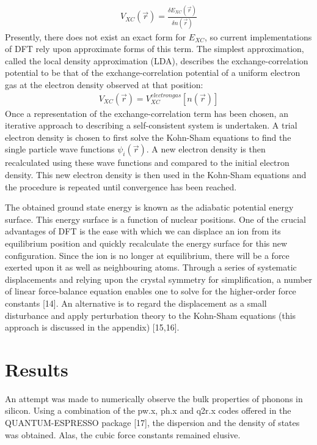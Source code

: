 \documentclass{article}
\numberwithin{equation}{section}
\begin{document}
\begin{align*}
	V_{XC}(\vec{r})=\frac{\delta E_{XC}(\vec{r})}{\delta n(\vec{r})}
\end{align*}
Presently, there does not exist an exact form for $E_{XC}$, so current implementations of DFT rely upon approximate forms of this term. The simplest approximation, called the local density approximation (LDA), describes the exchange-correlation potential to be that of the exchange-correlation potential of a uniform electron gas at the electron density observed at that position:
\begin{align*}
	V_{XC}(\vec{r})=V_{XC}^{electron gas}[n(\vec{r})]
\end{align*}
Once a representation of the exchange-correlation term has been chosen, an iterative approach to describing a self-consistent system is undertaken. A trial electron density is chosen to first solve the Kohn-Sham equations to find the single particle wave functions $\psi_i(\vec{r})$. A new electron density is then recalculated using these wave functions and compared to the initial electron density. This new electron density is then used in the Kohn-Sham equations and the procedure is repeated until convergence has been reached.

The obtained ground state energy is known as the adiabatic potential energy surface. This energy surface is a function of nuclear positions. One of the crucial advantages of DFT is the ease with which we can displace an ion from its equilibrium position and quickly recalculate the energy surface for this new configuration. Since the ion is no longer at equilibrium, there will be a force exerted upon it as well as neighbouring atoms. Through a series of systematic displacements and relying upon the crystal symmetry for simplification, a number of linear force-balance equation enables one to solve for the higher-order force constants [14]. An alternative is to regard the displacement as a small disturbance and apply perturbation theory to the Kohn-Sham equations (this approach is discussed in the appendix) [15,16]. 

\section{Results}
An attempt was made to numerically observe the bulk properties of phonons in silicon. Using a combination of the pw.x, ph.x and q2r.x codes offered in the QUANTUM-ESPRESSO package [17], the dispersion and the density of states was obtained. Alas, the cubic force constants remained elusive.
\end{document}
